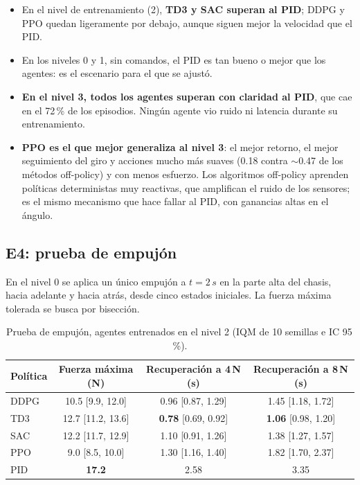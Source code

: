 \documentclass[11pt,a4paper]{article}
\newcommand{\SI}[2]{#1\,#2}  %
\newcommand{\best}[1]{\textbf{#1}}
\begin{document}
\begin{itemize}
  \item En el nivel de entrenamiento (2), \textbf{TD3 y SAC superan al PID}; DDPG y PPO quedan ligeramente por debajo, aunque siguen mejor la velocidad que el PID.
  \item En los niveles 0 y 1, sin comandos, el PID es tan bueno o mejor que los agentes: es el escenario para el que se ajustó.
  \item \textbf{En el nivel 3, todos los agentes superan con claridad al PID}, que cae en el 72\,\% de los episodios. Ningún agente vio ruido ni latencia durante su entrenamiento.
  \item \textbf{PPO es el que mejor generaliza al nivel 3}: el mejor retorno, el mejor seguimiento del giro y acciones mucho más suaves (0.18 contra $\sim$0.47 de los métodos off-policy) y con menos esfuerzo. Los algoritmos off-policy aprenden políticas deterministas muy reactivas, que amplifican el ruido de los sensores; es el mismo mecanismo que hace fallar al PID, con ganancias altas en el ángulo.
\end{itemize}

\subsection{E4: prueba de empujón}

En el nivel 0 se aplica un único empujón a $t=\SI{2}{s}$ en la parte alta del chasis, hacia adelante y hacia atrás, desde cinco estados iniciales. La fuerza máxima tolerada se busca por bisección.

\begin{table}[H]
\centering
\caption{Prueba de empujón, agentes entrenados en el nivel 2 (IQM de 10 semillas e IC 95\,\%).}
\label{tab:e4}
\small
\begin{tabular}{@{}lccc@{}}
\toprule
Política & Fuerza máxima (N) & Recuperación a \SI{4}{N} (s) & Recuperación a \SI{8}{N} (s) \\
\midrule
DDPG & 10.5 [9.9, 12.0] & 0.96 [0.87, 1.29] & 1.45 [1.18, 1.72] \\
TD3 & 12.7 [11.2, 13.6] & \best{0.78} [0.69, 0.92] & \best{1.06} [0.98, 1.20] \\
SAC & 12.2 [11.7, 12.9] & 1.10 [0.91, 1.26] & 1.38 [1.27, 1.57] \\
PPO & 9.0 [8.5, 10.0] & 1.30 [1.16, 1.40] & 1.82 [1.70, 2.37] \\
PID & \best{17.2} & 2.58 & 3.35 \\
\bottomrule
\end{tabular}
\end{table}
\end{document}
